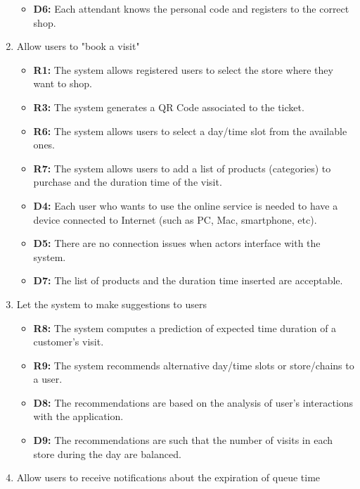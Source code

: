 \documentclass[table, 12pt]{article}
\begin{document}
\begin{flushleft}
\begin{enumerate}[label=\textbf{-G\arabic*}:]
{\begin{itemize}
                  \item \textbf{D6:} Each attendant knows the personal code and registers to the correct shop.
              \end{itemize}
              }
        \item {Allow users to "book a visit"
              \begin{itemize}
                  \item \textbf{R1:} The system allows registered users to select the store where they want to shop.
                  \item \textbf{R3:} The system generates a QR Code associated to the ticket.
                  \item \textbf{R6:} The system allows users to select a day/time slot from the available ones.
                  \item \textbf{R7:} The system allows users to add a list of products (categories) to purchase and the duration time of the visit.
                  \item \textbf{D4:} Each user who wants to use the online service is needed to have a device connected to Internet (such as PC, Mac, smartphone, etc).
                  \item \textbf{D5:} There are no connection issues when actors interface with the system.
                  \item \textbf{D7:} The list of products and the duration time inserted are acceptable.
              \end{itemize}
              }
        \item {Let the system to make suggestions to users
              \begin{itemize}
                  \item \textbf{R8:} The system computes a prediction of expected time duration of a customer's visit.
                  \item \textbf{R9:} The system recommends alternative day/time slots or store/chains to a user.
                  \item \textbf{D8:} The recommendations are based on the analysis of user's interactions with the application.
                  \item \textbf{D9:} The recommendations are such that the number of visits in each store during the day are balanced.
              \end{itemize}
              }
        \item {Allow users to receive notifications about the expiration of queue time
}
\end{enumerate}
\end{flushleft}
\end{document}
